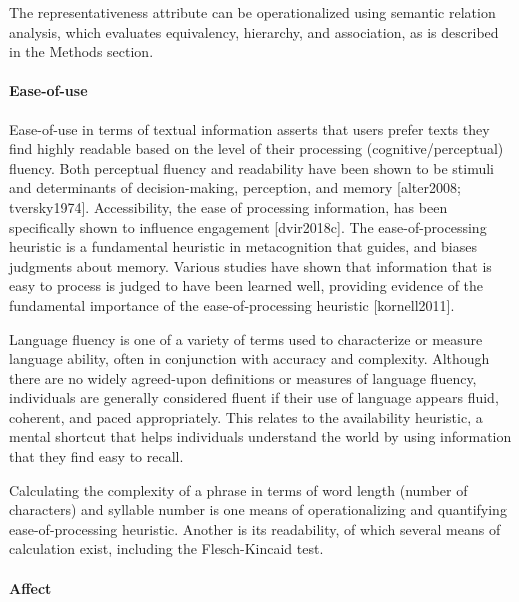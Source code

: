 \documentclass[
]{book}
\begin{document}
The representativeness attribute can be operationalized using semantic relation analysis, which evaluates equivalency, hierarchy, and association, as is described in the Methods section.

\paragraph{Ease-of-use}\label{ease-of-use}

Ease-of-use in terms of textual information asserts that users prefer texts they find highly readable based on the level of their processing (cognitive/perceptual) fluency. Both perceptual fluency and readability have been shown to be stimuli and determinants of decision-making, perception, and memory {[}alter2008; tversky1974{]}. Accessibility, the ease of processing information, has been specifically shown to influence engagement {[}dvir2018c{]}. The ease-of-processing heuristic is a fundamental heuristic in metacognition that guides, and biases judgments about memory. Various studies have shown that information that is easy to process is judged to have been learned well, providing evidence of the fundamental importance of the ease-of-processing heuristic {[}kornell2011{]}.

Language fluency is one of a variety of terms used to characterize or measure language ability, often in conjunction with accuracy and complexity. Although there are no widely agreed-upon definitions or measures of language fluency, individuals are generally considered fluent if their use of language appears fluid, coherent, and paced appropriately. This relates to the availability heuristic, a mental shortcut that helps individuals understand the world by using information that they find easy to recall.

Calculating the complexity of a phrase in terms of word length (number of characters) and syllable number is one means of operationalizing and quantifying ease-of-processing heuristic. Another is its readability, of which several means of calculation exist, including the Flesch-Kincaid test.

\paragraph{Affect}\label{affect}
\end{document}
